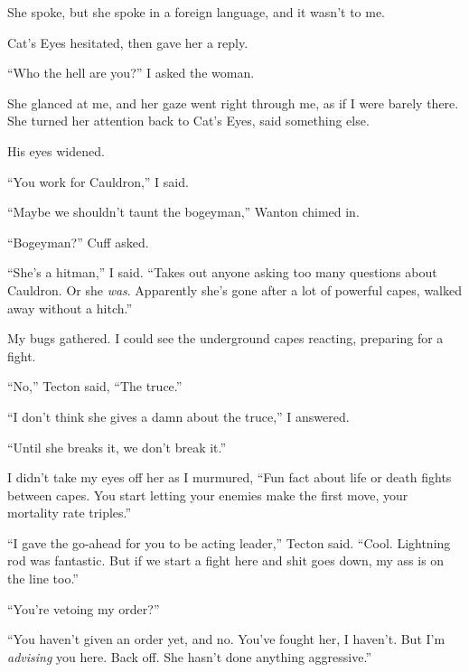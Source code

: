 She spoke, but she spoke in a foreign language, and it wasn't to me.



Cat's Eyes hesitated, then gave her a reply.



``Who the hell are you?'' I asked the woman.



She glanced at me, and her gaze went right through me, as if I were barely there.  She turned her attention back to Cat's Eyes, said something else.



His eyes widened.



``You work for Cauldron,'' I said.



``Maybe we shouldn't taunt the bogeyman,'' Wanton chimed in.



``Bogeyman?'' Cuff asked.



``She's a hitman,'' I said.  ``Takes out anyone asking too many questions about Cauldron.  Or she \emph{was}.  Apparently she's gone after a lot of powerful capes, walked away without a hitch.''



My bugs gathered.  I could see the underground capes reacting, preparing for a fight.



``No,'' Tecton said, ``The truce.''



``I don't think she gives a damn about the truce,'' I answered.



``Until she breaks it, we don't break it.''



I didn't take my eyes off her as I murmured, ``Fun fact about life or death fights between capes.  You start letting your enemies make the first move, your mortality rate triples.''



``I gave the go-ahead for you to be acting leader,'' Tecton said.  ``Cool.  Lightning rod was fantastic.  But if we start a fight here and shit goes down, my ass is on the line too.''



``You're vetoing my order?''



``You haven't given an order yet, and no.  You've fought her, I haven't.  But I'm \emph{advising} you here.  Back off.  She hasn't done anything aggressive.''



